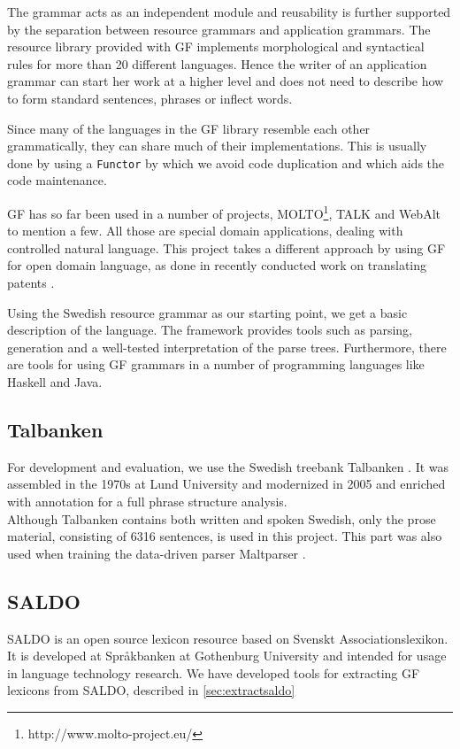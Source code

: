 \documentclass[10pt, a4paper]{article}
\begin{document}
The grammar acts as an independent module and reusability is further supported
by the separation between resource grammars and application grammars. The
resource library provided with GF implements morphological and syntactical
rules for more than 20 different languages.  Hence the writer of an application
grammar can start her work at a higher level and does not need to describe how
to form standard sentences, phrases or inflect words.

Since many of the languages in the GF library resemble each other grammatically,
they can share much of their implementations. This is usually done by using a
\verb|Functor| by which we avoid code duplication and which aids the code maintenance.

GF has so far been used in a number of projects,
MOLTO\footnote{http://www.molto-project.eu/}, TALK \cite{talk}
and WebAlt \cite{webalt} to mention a few. 
All those are special domain applications, dealing with controlled natural
language.
This project takes a different approach by using GF for open domain language,
as done in recently conducted work on translating patents \cite{patent}.

Using the Swedish resource grammar as our starting
point, we get a basic description of the language. The framework provides
tools such as parsing, generation and
a well-tested interpretation of the parse trees. Furthermore, there are tools
for using GF grammars in a number of programming languages like Haskell
and Java. 



\subsection{Talbanken}
For development and evaluation, we use the Swedish treebank
Talbanken \cite{talbanken}.
It was assembled in the 1970s at Lund University and modernized
in 2005 \cite{talbanken05} and
enriched with annotation for a full phrase structure analysis.  \\
Although Talbanken contains both written and spoken Swedish,
only the prose material, consisting of 6316 sentences, is used in this
project.
This part was also used when training the data-driven parser Maltparser \cite{malt}. \\

\subsection{SALDO}
SALDO \cite{saldo} is an open source lexicon resource
based on Svenskt Associationslexikon. It is
developed at Spr{\aa}kbanken at Gothenburg University
and intended for usage in language technology
research. 
We have developed tools for extracting GF lexicons
from SALDO, described in \ref{sec:extractsaldo}
\end{document}

